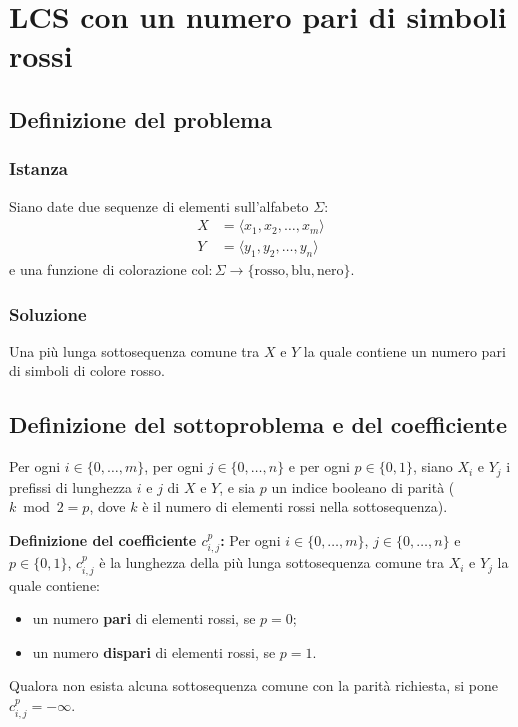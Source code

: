\chapter{LCS con un numero pari di simboli rossi}

\section{Definizione del problema}

\subsection{Istanza}
Siano date due sequenze di elementi sull'alfabeto $\Sigma$:
\begin{align*}
    X &= \langle x_1, x_2, \dots, x_m \rangle \\
    Y &= \langle y_1, y_2, \dots, y_n \rangle
\end{align*}
e una funzione di colorazione $\text{col} : \Sigma \to \{\text{rosso}, \text{blu}, \text{nero}\}$.

\subsection{Soluzione}
Una più lunga sottosequenza comune tra $X$ e $Y$ la quale contiene un numero pari di simboli di colore rosso.

\section{Definizione del sottoproblema e del coefficiente}
Per ogni $i \in \{0, \dots, m\}$, per ogni $j \in \{0, \dots, n\}$ e per ogni $p \in \{0, 1\}$, siano $X_i$ e $Y_j$ i prefissi di lunghezza $i$ e $j$ di $X$ e $Y$, e sia $p$ un indice booleano di parità ($k \bmod 2 = p$, dove $k$ è il numero di elementi rossi nella sottosequenza).

\medskip
\noindent
\textbf{Definizione del coefficiente $c_{i,j}^p$:} Per ogni $i \in \{0, \dots, m\}$, $j \in \{0, \dots, n\}$ e $p \in \{0, 1\}$, $c_{i,j}^p$ è la lunghezza della più lunga sottosequenza comune tra $X_i$ e $Y_j$ la quale contiene:
\begin{itemize}
    \item un numero \textbf{pari} di elementi rossi, se $p = 0$;
    \item un numero \textbf{dispari} di elementi rossi, se $p = 1$.
\end{itemize}
Qualora non esista alcuna sottosequenza comune con la parità richiesta, si pone $c_{i,j}^p = -\infty$.

